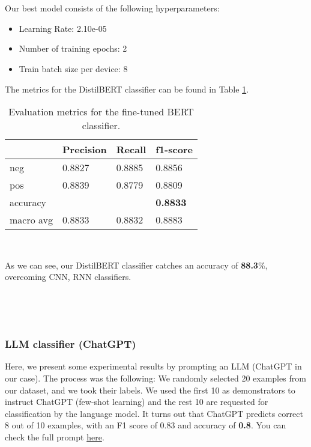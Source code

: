 \documentclass[10pt, a4paper]{article}
\begin{document}
    \ 
        
    \
    
    Our best model consists of the following hyperparameters:
    \begin{itemize}
        \item Learning Rate: 2.10e-05
        \item Number of training epochs: 2
        \item Train batch size per device: 8
        
    \end{itemize}

    The metrics for the DistilBERT classifier can be found in Table \ref{tab::ex-1-report-dev-bert}.
    
	\begin{table}
		\begin{tabular}{|l|l|l|l|}
			\hline
			\cellcolor{blue!25}\textbf{} & \cellcolor{blue!25}\textbf{Precision} &
			\cellcolor{blue!25}\textbf{Recall}  &
			\cellcolor{blue!25}\textbf{f1-score} \\
			\hline
			neg & 0.8827 & 0.8885 & 0.8856   \\\hline
			pos & 0.8839  & 0.8779 & 0.8809  \\\hline
			accuracy & & & \textbf{0.8833} \\\hline
			macro avg & 0.8833 & 0.8832 & 0.8883  \\\hline
			
			
		\end{tabular}
		\centering
		\caption{Evaluation metrics for the fine-tuned BERT classifier.}
		\label{tab::ex-1-report-dev-bert}
	\end{table}

 \
 
As we can see, our DistilBERT classifier catches an accuracy of \textbf{88.3}\%, overcoming CNN, RNN classifiers.
    
    \

    \
    \subsubsection{LLM classifier (ChatGPT)}
    Here, we present some experimental results by prompting an LLM (ChatGPT in our case). The process was the following: We randomly selected 20 examples from our dataset, and we took their labels. We used the first 10 as demonstrators to instruct ChatGPT (few-shot learning) and the rest 10 are requested for classification by the language model. It turns out that ChatGPT predicts correct 8 out of 10 examples, with an F1 score of 0.83 and accuracy of \textbf{0.8}. You can check the full prompt \href{https://chat.openai.com/share/dba55d12-a18b-4ffa-9fc9-87c46a313ebc}{here}.
	
	\printbibliography
	
\end{document}
